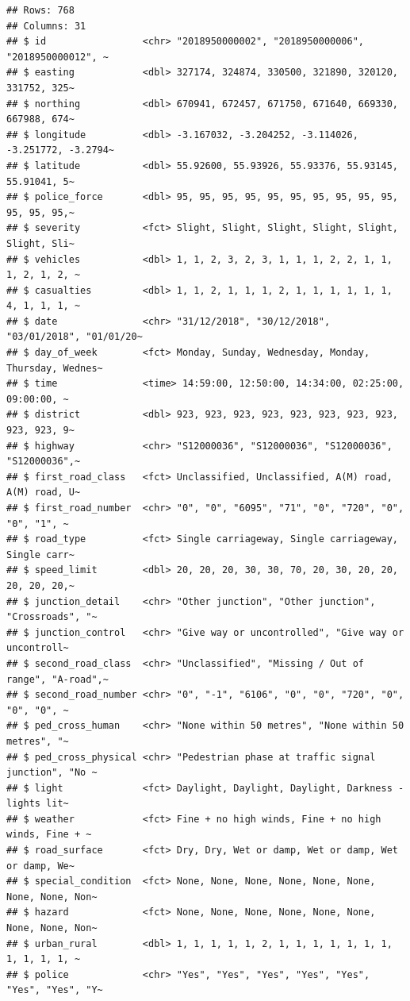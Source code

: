 \documentclass[
]{article}
\begin{document}
\begin{verbatim}
## Rows: 768
## Columns: 31
## $ id                 <chr> "2018950000002", "2018950000006", "2018950000012", ~
## $ easting            <dbl> 327174, 324874, 330500, 321890, 320120, 331752, 325~
## $ northing           <dbl> 670941, 672457, 671750, 671640, 669330, 667988, 674~
## $ longitude          <dbl> -3.167032, -3.204252, -3.114026, -3.251772, -3.2794~
## $ latitude           <dbl> 55.92600, 55.93926, 55.93376, 55.93145, 55.91041, 5~
## $ police_force       <dbl> 95, 95, 95, 95, 95, 95, 95, 95, 95, 95, 95, 95, 95,~
## $ severity           <fct> Slight, Slight, Slight, Slight, Slight, Slight, Sli~
## $ vehicles           <dbl> 1, 1, 2, 3, 2, 3, 1, 1, 1, 2, 2, 1, 1, 1, 2, 1, 2, ~
## $ casualties         <dbl> 1, 1, 2, 1, 1, 1, 2, 1, 1, 1, 1, 1, 1, 4, 1, 1, 1, ~
## $ date               <chr> "31/12/2018", "30/12/2018", "03/01/2018", "01/01/20~
## $ day_of_week        <fct> Monday, Sunday, Wednesday, Monday, Thursday, Wednes~
## $ time               <time> 14:59:00, 12:50:00, 14:34:00, 02:25:00, 09:00:00, ~
## $ district           <dbl> 923, 923, 923, 923, 923, 923, 923, 923, 923, 923, 9~
## $ highway            <chr> "S12000036", "S12000036", "S12000036", "S12000036",~
## $ first_road_class   <fct> Unclassified, Unclassified, A(M) road, A(M) road, U~
## $ first_road_number  <chr> "0", "0", "6095", "71", "0", "720", "0", "0", "1", ~
## $ road_type          <fct> Single carriageway, Single carriageway, Single carr~
## $ speed_limit        <dbl> 20, 20, 20, 30, 30, 70, 20, 30, 20, 20, 20, 20, 20,~
## $ junction_detail    <chr> "Other junction", "Other junction", "Crossroads", "~
## $ junction_control   <chr> "Give way or uncontrolled", "Give way or uncontroll~
## $ second_road_class  <chr> "Unclassified", "Missing / Out of range", "A-road",~
## $ second_road_number <chr> "0", "-1", "6106", "0", "0", "720", "0", "0", "0", ~
## $ ped_cross_human    <chr> "None within 50 metres", "None within 50 metres", "~
## $ ped_cross_physical <chr> "Pedestrian phase at traffic signal junction", "No ~
## $ light              <fct> Daylight, Daylight, Daylight, Darkness - lights lit~
## $ weather            <fct> Fine + no high winds, Fine + no high winds, Fine + ~
## $ road_surface       <fct> Dry, Dry, Wet or damp, Wet or damp, Wet or damp, We~
## $ special_condition  <fct> None, None, None, None, None, None, None, None, Non~
## $ hazard             <fct> None, None, None, None, None, None, None, None, Non~
## $ urban_rural        <dbl> 1, 1, 1, 1, 1, 2, 1, 1, 1, 1, 1, 1, 1, 1, 1, 1, 1, ~
## $ police             <chr> "Yes", "Yes", "Yes", "Yes", "Yes", "Yes", "Yes", "Y~
\end{verbatim}
\end{document}
